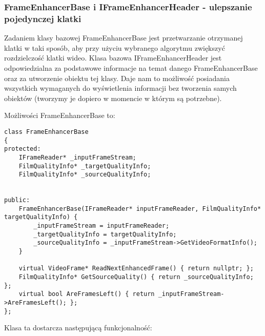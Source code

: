 \documentclass[twoside]{projektInzynierskiMS}
\begin{document}
\subsubsection{FrameEnhancerBase i IFrameEnhancerHeader - ulepszanie pojedynczej klatki}
Zadaniem klasy bazowej FrameEnhancerBase jest przetwarzanie otrzymanej klatki w taki sposób, aby przy użyciu wybranego algorytmu zwiększyć rozdzielczość klatki wideo. Klasa bazowa IFrameEnhancerHeader jest odpowiedzialna za podstawowe informacje na temat danego FrameEnhancerBase oraz za utworzenie obiektu tej klasy. Daje nam to możliwość posiadania wszystkich wymaganych do wyświetlenia informacji bez tworzenia samych obiektów (tworzymy je dopiero w momencie w którym są potrzebne).

Możliwości FrameEnhancerBase to: 

\begin{verbatim}
class FrameEnhancerBase
{
protected:
	IFrameReader* _inputFrameStream;
	FilmQualityInfo* _targetQualityInfo;
	FilmQualityInfo* _sourceQualityInfo;


public:
	FrameEnhancerBase(IFrameReader* inputFrameReader, FilmQualityInfo* targetQualityInfo) {
		_inputFrameStream = inputFrameReader;
		_targetQualityInfo = targetQualityInfo;
		_sourceQualityInfo = _inputFrameStream->GetVideoFormatInfo();
	}

	virtual VideoFrame* ReadNextEnhancedFrame() { return nullptr; };
	FilmQualityInfo* GetSourceQuality() { return _sourceQualityInfo; };
	virtual bool AreFramesLeft() { return _inputFrameStream->AreFramesLeft(); };
};
\end{verbatim}

Klasa ta dostarcza następującą funkcjonalność:
\end{document}
